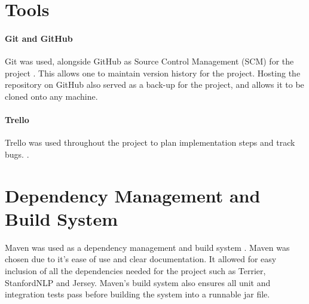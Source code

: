 \documentclass{l4proj}
\begin{document}
\section{Tools}
\paragraph{Git and GitHub}
Git was used, alongside GitHub as Source Control Management (SCM) for the project \cite{git} \cite{github}. This allows one to maintain version history for the project. Hosting the repository on GitHub also served as a back-up for the project, and allows it to be cloned onto any machine.
\paragraph{Trello}
Trello was used throughout the project to plan implementation steps and track bugs. \cite{trello}.
\section{Dependency Management and Build System}
Maven was used as a dependency management and build system \cite{maven}. Maven was chosen due to it's ease of use and clear documentation. It allowed for easy inclusion of all the dependencies needed for the project such as Terrier, StanfordNLP and Jersey. Maven's build system also ensures all unit and integration tests pass before building the system into a runnable jar file.
\end{document}
